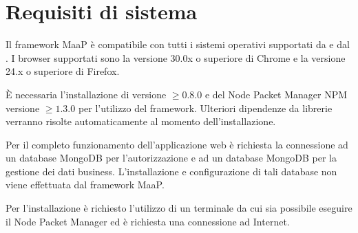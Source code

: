 \section{Requisiti di sistema}

Il framework MaaP è compatibile con tutti i sistemi operativi supportati da  e dal . I browser supportati sono la versione 30.0x o superiore di Chrome e la versione 24.x o superiore di Firefox.

È necessaria l'installazione di  versione $\geq 0.8.0$ e del Node Packet Manager NPM versione $\geq 1.3.0$ per l'utilizzo del framework. Ulteriori dipendenze da librerie verranno risolte automaticamente al momento dell'installazione.

Per il completo funzionamento dell'applicazione web è richiesta la connessione ad un database MongoDB per l'autorizzazione e ad un database MongoDB per la gestione dei dati business. L'installazione e configurazione di tali database non viene effettuata dal framework MaaP.

Per l'installazione è richiesto l'utilizzo di un terminale da cui sia possibile eseguire il Node Packet Manager ed è richiesta una connessione ad Internet.
